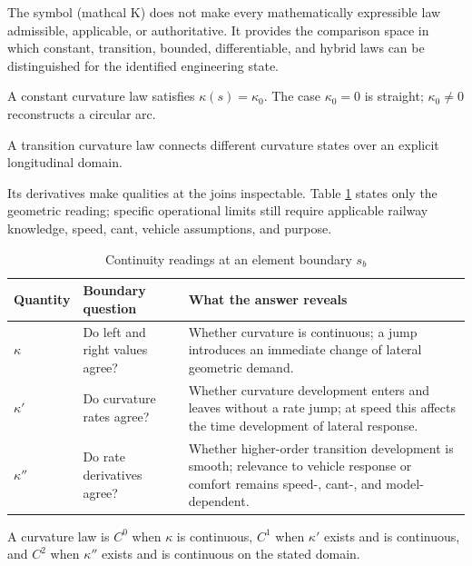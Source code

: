 The symbol (mathcal K) does not make every mathematically expressible law
admissible, applicable, or authoritative. It provides the comparison space in
which constant, transition, bounded, differentiable, and hybrid laws can be
distinguished for the identified engineering state.

\begin{definition}
\label{def:constant-curvature}
A constant curvature law satisfies $\kappa(s)=\kappa_0$. The case
$\kappa_0=0$ is straight; $\kappa_0\neq0$ reconstructs a circular arc.
\end{definition}

\begin{definition}
\label{def:transition-curvature}
A transition curvature law connects different curvature states over an
explicit longitudinal domain.
\end{definition}

Its derivatives make qualities at the joins inspectable. Table
\ref{tab:curvature-continuity-reading} states only the geometric reading;
specific operational limits still require applicable railway knowledge,
speed, cant, vehicle assumptions, and purpose.

\begin{table}[htbp]
\centering
\small
\caption{Continuity readings at an element boundary $s_b$}
\label{tab:curvature-continuity-reading}
\begin{tabular}{@{}p{}p{}p{}@{}}
\toprule
Quantity & Boundary question & What the answer reveals \\
\midrule
$\kappa$ & Do left and right values agree? & Whether curvature is continuous; a jump introduces an immediate change of lateral geometric demand. \\
$\kappa'$ & Do curvature rates agree? & Whether curvature development enters and leaves without a rate jump; at speed this affects the time development of lateral response. \\
$\kappa''$ & Do rate derivatives agree? & Whether higher-order transition development is smooth; relevance to vehicle response or comfort remains speed-, cant-, and model-dependent. \\
\bottomrule
\end{tabular}
\end{table}

\begin{definition}
\label{def:curvature-continuity}
A curvature law is $C^0$ when $\kappa$ is continuous, $C^1$ when
$\kappa'$ exists and is continuous, and $C^2$ when $\kappa''$ exists and
is continuous on the stated domain.
\end{definition}

